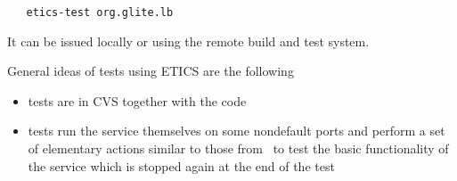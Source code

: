 \begin{verbatim}
   etics-test org.glite.lb
\end{verbatim}

It can be issued locally or using the remote build and test system.

General ideas of \LB tests using ETICS are the following

\begin{itemize}
\item tests are in CVS together with the code

\item tests run the service themselves on some nondefault ports and perform a set of
elementary actions similar to those from \ctblb{}\ 
to test the basic functionality of the service which is stopped again at the
end of the test

\end{itemize}

